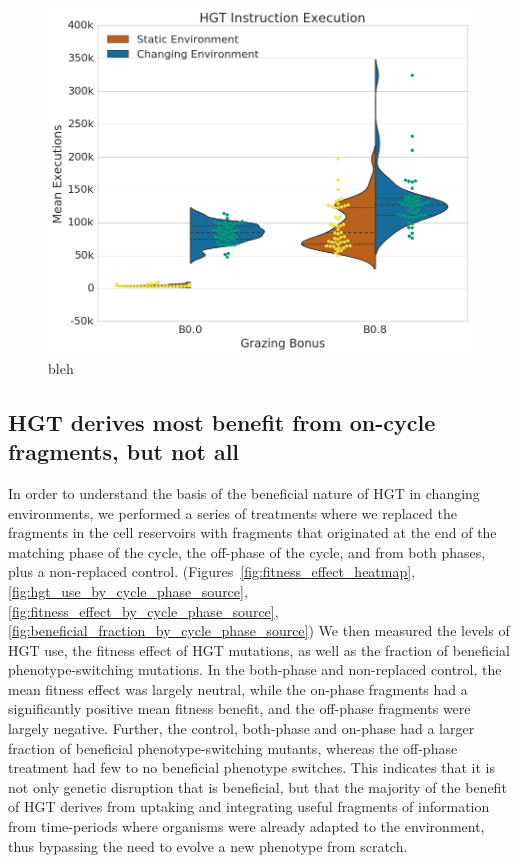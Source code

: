 \documentclass[PhD]{msu-thesis}
\begin{document}
\begin{figure}[h!]
\begin{center}
\includegraphics[width=0.7\columnwidth]{figures/HGT/hgt_inst_execution.png}
\caption{bleh%
}\label{fig:hgt_inst_execution}
\end{center}
\end{figure}




\subsection{HGT derives most benefit from on-cycle fragments, but not all}

In order to understand the basis of the beneficial nature of HGT in changing environments, we performed a series of treatments where we replaced the fragments in the cell reservoirs with fragments that originated at the end of the matching phase of the cycle, the off-phase of the cycle, and from both phases, plus a non-replaced control. (Figures~\ref{fig:fitness_effect_heatmap}, \ref{fig:hgt_use_by_cycle_phase_source}, \ref{fig:fitness_effect_by_cycle_phase_source}, \ref{fig:beneficial_fraction_by_cycle_phase_source})
We then measured the levels of HGT use, the fitness effect of HGT mutations, as well as the fraction of beneficial phenotype-switching mutations. In the both-phase and non-replaced control, the mean fitness effect was largely neutral, while the on-phase fragments had a significantly positive mean fitness benefit, and the off-phase fragments were largely negative. Further, the control, both-phase and on-phase had a larger fraction of beneficial phenotype-switching mutants, whereas the off-phase treatment had few to no beneficial phenotype switches. This indicates that it is not only genetic disruption that is beneficial, but that the majority of the benefit of HGT derives from uptaking and integrating useful fragments of information from time-periods where organisms were already adapted to the environment, thus bypassing the need to evolve a new phenotype from scratch.
\end{document}
